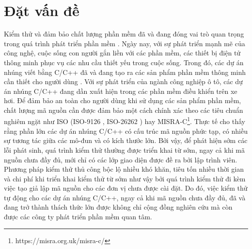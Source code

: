 \chapter{Đặt vấn đề}\label{chap1}
Kiểm thử và đảm bảo chất lượng phần mềm đã và đang đóng vai trò quan trọng trong quá trình phát triển phần mềm \cite{GiaoTrinhKiemThu}. Ngày nay, với sự phát triển mạnh mẽ của công nghệ, cuộc sống con người gắn liền với các phần mềm, các thiết bị điện tử thông minh phục vụ các nhu cầu thiết yếu trong cuộc sống. Trong đó, các dự án nhúng viết bằng C/C++ đã và đang tạo ra các sản phẩm phần mềm thông minh cần thiết cho người dùng \cite{plauger1997embedded}. Với sự phát triển của ngành công nghiệp ô tô, các dự án nhúng C/C++ đang dần xuất hiện trong các phần mềm điều khiển trên xe hơi\cite{ehman2017power}. Để đảm bảo an toàn cho người dùng khi sử dụng các sản phẩm phần mềm, chất lượng mã nguồn cần được đảm bảo một cách chính xác theo các tiêu chuẩn nghiêm ngặt như ISO (ISO-9126 \cite{ali2017iso}, ISO-26262 \cite{Hillenbrand2012_1000025616}) hay MISRA-C\footnote{https://misra.org.uk/misra-c/}. Thực tế cho thấy rằng phần lớn các dự án nhúng C/C++ có cấu trúc mã nguồn phức tạp, có nhiều sự tương tác giữa các mô-đun và có kích thước lớn. Bởi vậy, để phát hiện sớm các lỗi phát sinh, quá trình kiểm thử thường được triển khai từ sớm, ngay cả khi mã nguồn chưa đầy đủ, mới chỉ có các lớp giao diện được đề ra bởi lập trình viên. Phương pháp kiểm thử thủ công bộc lộ nhiều khó khăn, tiêu tốn nhiều thời gian và chi phí khi triển khai kiểm thử từ sớm như vậy bởi quá trình kiểm thử đi kèm việc tạo giả lập mã nguồn cho các đơn vị chưa được cài đặt. Do đó, việc kiểm thử tự động cho các dự án nhúng C/C++, ngay cả khi mã nguồn chưa đầy đủ, đã và đang trở thành thách thức lớn được không chỉ cộng đồng nghiên cứu mà còn được các công ty phát triển phần mềm quan tâm.

